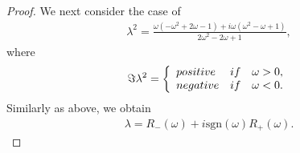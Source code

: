\documentclass[10pt,a4paper]{amsart}
\begin{document}
\begin{proof}
 We next consider the case of 
\begin{align*}
\lambda ^2= \frac{\omega (-\omega ^2 +2\omega -1) + i\omega (\omega ^2 -\omega +1)}{2\omega ^2 -2\omega +1}, 
 \end{align*}
where 
\begin{eqnarray*}
\Im \lambda^2 = \left\{
\begin{array}{ll}
{\rm positive} &  {\rm if} \quad  \omega >0,\\
{\rm negative} & {\rm if} \quad \omega <0.
\end{array}
\right.
\end{eqnarray*}
Similarly as above, we obtain
\begin{align*}
    \lambda = R_{-}(\omega)+i\mathrm{sgn}(\omega)R_{+}(\omega).
\end{align*}


\end{proof}
\end{document}
